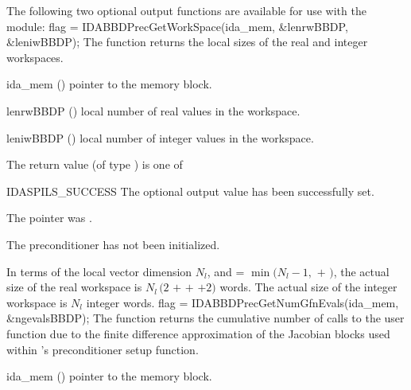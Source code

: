 {{}
The following two optional output functions are available for use with
the {\idabbdpre} module:
{
  flag = IDABBDPrecGetWorkSpace(ida\_mem, \&lenrwBBDP, \&leniwBBDP);
}
{
  The function  returns the local sizes
  of the {\idabbdpre} real and integer workspaces.
}
{
  \begin{args}[lenrwBBDP]
  \item[ida\_mem] ()
    pointer to the {\idas} memory block.
  \item[lenrwBBDP] ()
    local number of real values in the {\idabbdpre} workspace.
  \item[leniwBBDP] ()
    local number of integer values in the {\idabbdpre} workspace.
  \end{args}
}
{
  The return value  (of type ) is one of
  \begin{args}
  \item[IDASPILS\_SUCCESS] 
    The optional output value has been successfully set.
  \item[\id{IDASPILS\_MEM\_NULL}] 
    The  pointer was .
  \item[\Id{IDASPILS\_PMEM\_NULL}]
    The {\idabbdpre} preconditioner has not been initialized.
  \end{args}
}
{
  In terms of the local vector dimension $N_l$, and
   = $\min ( N_l - 1 ,$  $+$ $)$,
  the actual size of the real workspace is
  $N_l \,(2$  $+$  $+$  $+2)$  words.
  The actual size of the integer workspace is $N_l$ integer words.
}
{
  flag = IDABBDPrecGetNumGfnEvals(ida\_mem, \&ngevalsBBDP);
}
{
  The function  returns the
  cumulative number of calls to the user  function due to the 
  finite difference approximation of the Jacobian blocks used within
  {\idabbdpre}'s preconditioner setup function.
}
{
  \begin{args}[ngevalsBBDP]
  \item[ida\_mem] ()
    pointer to the {\idas} memory block.

\end{args}}}
